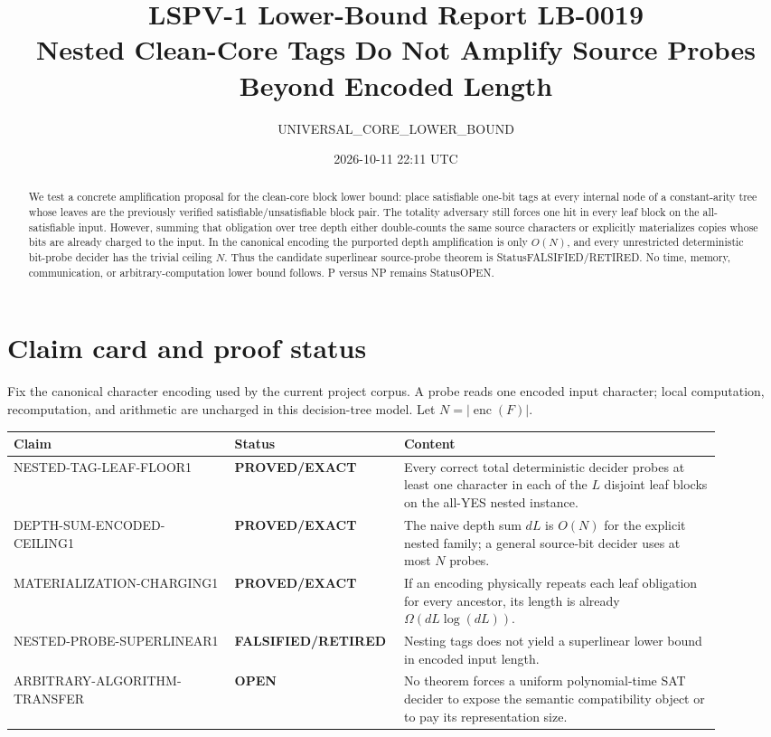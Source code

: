\documentclass[11pt]{article}
\title{LSPV-1 Lower-Bound Report LB-0019\\Nested Clean-Core Tags Do Not Amplify Source Probes Beyond Encoded Length}
\author{UNIVERSAL\_CORE\_LOWER\_BOUND}
\date{2026-10-11 22:11 UTC}
\newcommand{\Status}[1]{\textbf{#1}}
\begin{document}
\maketitle

\begin{abstract}
We test a concrete amplification proposal for the clean-core block lower bound: place satisfiable one-bit tags at every internal node of a constant-arity tree whose leaves are the previously verified satisfiable/unsatisfiable block pair.  The totality adversary still forces one hit in every leaf block on the all-satisfiable input.  However, summing that obligation over tree depth either double-counts the same source characters or explicitly materializes copies whose bits are already charged to the input.  In the canonical encoding the purported depth amplification is only $O(N)$, and every unrestricted deterministic bit-probe decider has the trivial ceiling $N$.  Thus the candidate superlinear source-probe theorem is Status{FALSIFIED/RETIRED}.  No time, memory, communication, or arbitrary-computation lower bound follows.  P versus NP remains Status{OPEN}.
\end{abstract}

\section{Claim card and proof status}

Fix the canonical character encoding used by the current project corpus.  A probe reads one encoded input character; local computation, recomputation, and arithmetic are uncharged in this decision-tree model.  Let $N=|\operatorname{enc}(F)|$.

\begin{center}
\begin{tabular}{>{\raggedright\arraybackslash}p{0.30\linewidth}p{0.18\linewidth}p{0.43\linewidth}}
\toprule
Claim & Status & Content \\
\midrule
NESTED-TAG-LEAF-FLOOR1 & \Status{PROVED/EXACT} & Every correct total deterministic decider probes at least one character in each of the $L$ disjoint leaf blocks on the all-YES nested instance.\\
DEPTH-SUM-ENCODED-CEILING1 & \Status{PROVED/EXACT} & The naive depth sum $dL$ is $O(N)$ for the explicit nested family; a general source-bit decider uses at most $N$ probes.\\
MATERIALIZATION-CHARGING1 & \Status{PROVED/EXACT} & If an encoding physically repeats each leaf obligation for every ancestor, its length is already $\Omega(dL\log(dL))$.\\
NESTED-PROBE-SUPERLINEAR1 & \Status{FALSIFIED/RETIRED} & Nesting tags does not yield a superlinear lower bound in encoded input length.\\
ARBITRARY-ALGORITHM-TRANSFER & \Status{OPEN} & No theorem forces a uniform polynomial-time SAT decider to expose the semantic compatibility object or to pay its representation size.\\
\bottomrule
\end{tabular}
\end{center}
\end{document}
